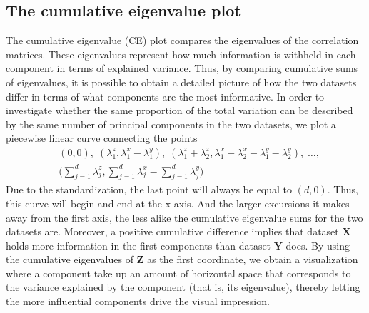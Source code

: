 \documentclass[a4paper,12pt]{article}
\begin{document}
\subsection*{The cumulative eigenvalue plot}
The cumulative eigenvalue (CE) plot compares the eigenvalues of the correlation matrices. These eigenvalues represent how much information is withheld in each component in terms of explained variance. Thus, by comparing cumulative sums of eigenvalues, it is possible to obtain a detailed picture of how the two datasets differ in terms of what components are the most informative. In order to investigate whether the same proportion of the total variation can be described by the same number of principal components in the two datasets, we plot a piecewise linear curve connecting the points
\begin{align*}
&(0,0), \;
(\lambda_1^z,\lambda_{1}^x-\lambda_{1}^y), \;
(\lambda_1^z + \lambda_2^z,\lambda_{1}^x+\lambda_{2}^x-\lambda_{1}^y-\lambda_{2}^y), \;
\ldots, \\
&\bigg( \sum_{j=1}^d \lambda_j^z, \sum_{j=1}^d \lambda_{j}^x - \sum_{j=1}^d \lambda_{j}^y \bigg)
\end{align*}
Due to the standardization, the last point will always be equal to $(d,0)$. Thus, this curve will begin and end at the x-axis. And the larger excursions it makes away from the  first axis, the less alike the cumulative eigenvalue sums for the two datasets are. Moreover, a positive cumulative difference implies that dataset $\mathbf{X}$ holds more information in the first components than dataset $\mathbf{Y}$ does. By using the cumulative eigenvalues of $\mathbf{Z}$ as the first coordinate, we obtain a visualization where a component take up an amount of horizontal space that corresponds to the variance explained by the component (that is, its eigenvalue), thereby letting the more influential components drive the visual impression. 

\end{document}

